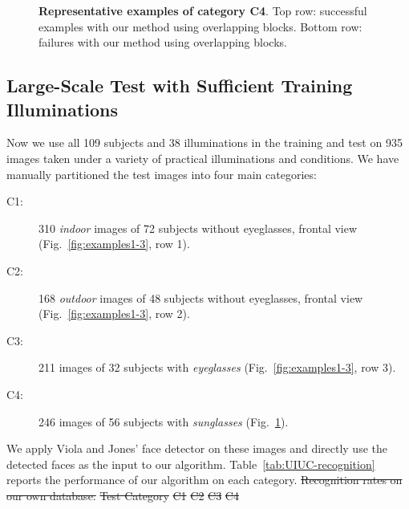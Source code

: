 \documentclass[12pt,journal,draftcls,letterpaper,onecolumn]{IEEEtran}
\providecommand{\DIFdel}[1]{{\protect\color{red}\sout{#1}}}                      %
\providecommand{\DIFdelbegin}{} %
\providecommand{\DIFaddbeginFL}{} %
\providecommand{\DIFaddendFL}{} %
\providecommand{\DIFdelbeginFL}{} %
\providecommand{\DIFdelendFL}{} %
\begin{document}
\begin{figure}[t]
 \DIFaddbeginFL \vspace{-.2in}
 \DIFaddendFL \caption{{\bf Representative examples of category C4}. Top row: successful examples with our method using overlapping blocks. Bottom row: failures with our method using overlapping blocks.}\label{fig:examples4}
\DIFdelbeginFL %
\DIFdelendFL \DIFaddbeginFL \vspace{-.5in}
\DIFaddendFL \end{figure}

\subsection{Large-Scale Test with Sufficient Training
Illuminations} Now we use all 109 subjects and 38 illuminations
in the training and test on 935 images taken under a variety of
practical illuminations and conditions. We have manually partitioned the test images into four main
categories:
\begin{description}
\item[C1:] 310 \emph{indoor} images of 72 subjects without
    eyeglasses, frontal view
    (Fig.~\ref{fig:examples1-3}, row 1).
\item[C2:] 168 \emph{outdoor} images of 48 subjects without
    eyeglasses, frontal view
    (Fig.~\ref{fig:examples1-3}, row 2).
\item[C3:] 211 images of 32 subjects with \emph{eyeglasses}
    (Fig.~\ref{fig:examples1-3}, row 3).
\item[C4:] 246 images of 56 subjects with \emph{sunglasses}
    (Fig.~\ref{fig:examples4}).
\end{description}
We apply Viola and Jones' face detector on these images and
directly use the detected faces as the input to our algorithm.
Table~\ref{tab:UIUC-recognition} reports the performance of our
algorithm on each category.
\DIFdelbegin %
{%
\DIFdel{Recognition rates on our own database.}}
\DIFdel{Test Category }%
\DIFdel{C1 }%
\DIFdel{C2 }%
\DIFdel{C3 }%
\DIFdel{C4  }%
\end{document}
